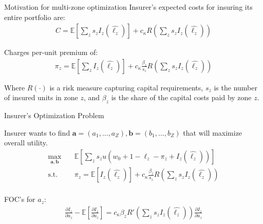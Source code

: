 \documentclass{beamer}
\begin{document}
    \begin{frame}{Motivation for multi-zone optimization}
        Insurer's expected costs for insuring its entire portfolio are:
        \begin{align*}
            C = \mathbb{E}\left [ \sum_z s_z I_z (\hat{\ell_z}) \right ] + c_{\kappa} R \left (\sum_z s_z I_z(\hat{\ell_z}) \right )
        \end{align*}

        Charges per-unit premium of:
        \begin{align*}
            \pi_z = \mathbb{E}\left [ \sum_z I_z (\hat{\ell_z}) \right ] +  c_{\kappa} \frac{\beta_z}{s_z} R \left (\sum_z s_z I_z(\hat{\ell_z}) \right )
        \end{align*}

        Where $R(\cdot)$ is a risk measure capturing capital requirements, $s_z$ is the number of insured units in zone $z$, and $\beta_z$ is the share of the capital costs paid by zone $z$. 
    \end{frame}

    \begin{frame}{Insurer's Optimization Problem}

        Insurer wants to find $\mathbf{a} = (a_1,...,a_
        Z), \mathbf{b}= (b_1, ...,b_Z)$ that will maximize overall utility.
        \begin{align*}
            \max_{\mathbf{a},\mathbf{b}}  & \quad \mathbb{E} \left [ \sum_z s_z u\left ( w_0 + 1 - \ell_z - \pi_z + I_z(\hat{\ell_z}) \right ) \right ] \\
    \text{s.t.} & \quad \pi_z = \mathbb{E}\left [ I_z (\hat{\ell_z}) \right ] +  c_{\kappa} \frac{\beta_z}{s_z} R \left (\sum_z s_z I_z(\hat{\ell_z}) \right )\\
        \end{align*}

        FOC's for $a_z$:
        \begin{align*}
            \frac{\partial I_z}{\partial a_z} - \mathbb{E} \left [ \frac{\partial I_z}{\partial a_z} \right ] = c_{\kappa} \beta_z R' \left (\sum_z s_z I_z(\hat{\ell_z}) \right ) \frac{\partial I_z}{\partial a_z}
        \end{align*}
        
    \end{frame}
\end{document}
